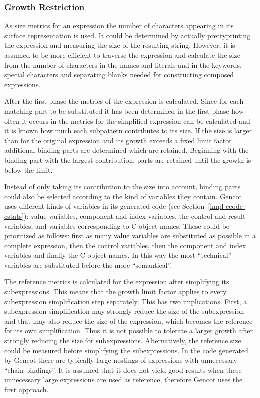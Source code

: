 \subsubsection{Growth Restriction}

As size metrics for an expression the number of characters appearing in its surface representation is used. It could be determined
by actually prettyprinting the expression and measuring the size of the resulting string. However, it is assumed to be more
efficient to traverse the expression and calculate the size from the number of characters in the names and literals and in
the keywords, special characters and separating blanks needed for constructing composed expressions.

After the first phase the metrics of the  expression is calculated. Since for each matching part to be substituted it 
has been determined in the first phase how often it occurs in  the metrics for the simplified expression can be 
calculated and it is known how much each subpattern contributes to its size. If the size is larger than for the original 
expression and its growth exceeds a fixed limit factor additional binding parts are determined which are retained. 
Beginning with the binding part with the largest contribution, parts are retained until the growth is below the limit.

Instead of only taking its contribution to the size into account, binding parts could also be selected according to the kind of
variables they contain. 
Gencot uses different kinds of variables in its generated code (see Section~\ref{impl-ccode-cstats}): value variables, component and 
index variables, the control and result variables, and variables corresponding to C object names. These could be prioritized
as follows: first as many value 
variables are substituted as possible in a complete expression, then the control variables, then the component and index variables and
finally the C object names. In this way the most ``technical'' variables are substituted before the more ``semantical''.

The reference metrics is calculated for the expression after simplifying its subexpressions. This means that the growth limit factor
applies to every subexpression simplification step separately. This has two implications. First, a subexpression simplification
may strongly reduce the size of the subexpression and that may also reduce the size of the  expression, which becomes 
the reference for its own simplification. Thus it is not possible to tolerate a larger growth after strongly reducing the size for
subexpressions. Alternatively, the reference size could be measured before simplifying the subexpressions. In the code generated
by Gencot there are typically large nestings of  expressions with unnecessary ``chain bindings''. It is assumed that it
does not yield good results when these unnecessary large expressions are used as reference, therefore Gencot uses the first approach.

